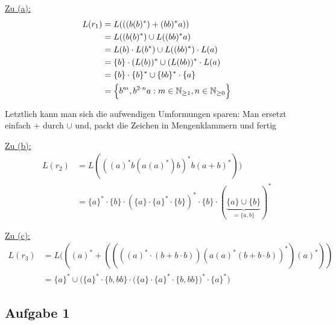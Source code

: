 \begin{lösung}
	\underline{Zu (a):}
	\begin{align*}
		L(r_1)
		&=L(((b(b)^\ast)+(bb)^\ast a))\\
		&=L((b(b)^\ast)\cup L((bb)^\ast a)\\
		&=L(b)\cdot L(b^\ast)\cup L((bb)^\ast)\cdot L(a)\\
		&=\lbrace b\rbrace\cdot (L(b))^\ast\cup(L(bb))^\ast\cdot L(a)\\
		&=\lbrace b\rbrace\cdot\lbrace b\rbrace^\ast\cup\lbrace bb\rbrace^\ast\cdot\lbrace a\rbrace\\
		&=\Big\lbrace b^m, b^{2\cdot n}a:m\in\mathbb{N}_{\geq1},n\in\mathbb{N}_{\geq0}\Big\rbrace
	\end{align*}
	
	Letztlich kann man sich die aufwendigen Umformungen sparen: Man ersetzt einfach + durch $\cup$ und, packt die Zeichen in Mengenklammern und fertig
		
	\underline{Zu (b):}
	\begin{align*}
		L(r_2)&=L(((a)^\ast b(a(a)^\ast)b)^\ast b(a+b)^\ast))\\
		&=\lbrace a\rbrace^\ast\cdot\lbrace b\rbrace\cdot(\lbrace a\rbrace\cdot\lbrace a\rbrace^\ast\cdot\lbrace b \rbrace)^\ast\cdot\lbrace b\rbrace\cdot(\underbrace{\lbrace a\rbrace\cup\lbrace b\rbrace}_{=\lbrace a,b\rbrace})^\ast
	\end{align*}
	
	\underline{Zu (c):}
	\begin{align*}
		L(r_3)&=L(((a)^\ast+((((a)^\ast\cdot(b+b\cdot b))(a(a)^\ast(b+b\cdot b))^\ast)(a)^\ast))\\
		&=\lbrace a\rbrace^\ast\cup\Big(\lbrace a\rbrace^\ast\cdot\lbrace b,bb\rbrace\cdot\big(\lbrace a\rbrace\cdot\lbrace a\rbrace^\ast\cdot\lbrace b,bb\rbrace\big)^\ast\cdot\lbrace a\rbrace^\ast\Big)
	\end{align*}
\end{lösung}

\subsection{Aufgabe 1}

